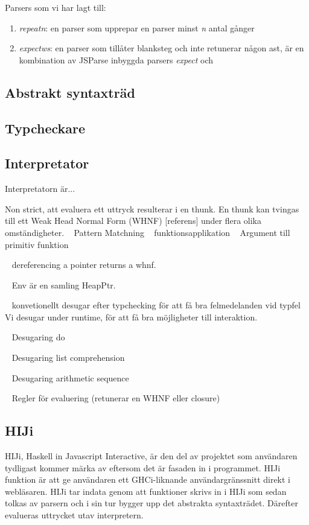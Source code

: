 Parsers som vi har lagt till:
\begin{enumerate}
    \item{\emph{repeatn}: en parser som upprepar en parser minst \emph{n} antal gånger}
    \item{\emph{expectws}: en parser som tillåter blanksteg och inte retunerar någon ast, är en kombination av JSParse inbyggda parsers \emph{expect} och }
\end{enumerate}

\subsection{Abstrakt syntaxträd} 

\subsection{Typcheckare} 

\subsection{Interpretator}

Interpretatorn är...

Non strict, att evaluera ett uttryck resulterar i en thunk. En thunk kan tvingas till ett Weak Head Normal Form (WHNF) [referens] under flera olika omständigheter.
~ Pattern Matchning
~ funktionsapplikation
~ Argument till primitiv funktion

~ dereferencing a pointer returns a whnf.

~ Env är en samling HeapPtr.


~ konvetionellt desugar efter typchecking för att få bra felmedelanden vid typfel
Vi desugar under runtime, för att få bra möjligheter till interaktion.

~ Desugaring do

~ Desugaring list comprehension

~ Desugaring arithmetic sequence

~ Regler för evaluering (retunerar en WHNF eller closure)



\subsection{HIJi}
HIJi, Haskell in Javascript Interactive, är den del av projektet som användaren tydligast kommer märka av eftersom det är fasaden in i programmet.
HIJi funktion är att ge användaren ett GHCi-liknande användargränssnitt direkt i webläsaren. 
HIJi tar indata genom att funktioner skrivs in i HIJi som sedan tolkas av parsern och i sin tur bygger upp det abstrakta syntaxträdet. Därefter evalueras uttrycket utav interpretern.

